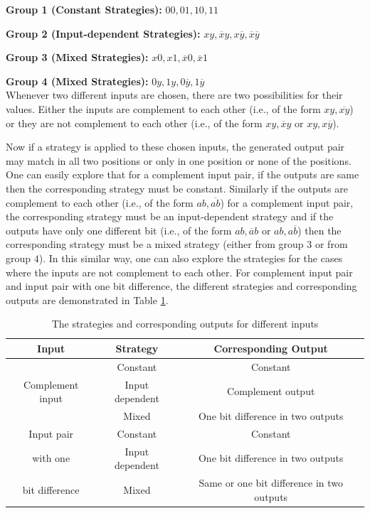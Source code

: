 \documentclass[]{svjour3}
\begin{document}
\textbf{Group 1 (Constant Strategies):} $00, 01, 10, 11$

\textbf{Group 2 (Input-dependent Strategies):} $xy, \overline{x}y, x\overline{y}, \overline{x}\overline{y}$

\textbf{Group 3 (Mixed Strategies):} $x0, x1, \overline{x}0, \overline{x}1$

\textbf{Group 4 (Mixed Strategies):} $0y, 1y, 0\overline{y}, 1\overline{y}$\\


Whenever two different inputs are chosen, there are two possibilities for their values. Either the inputs are complement to each other (i.e., of the form $xy, \overline{xy}$) or they are not complement to each other (i.e., of the form $xy, \overline{x}y$ or $xy, x\overline{y}$). 

Now if a strategy is applied to these chosen inputs, the generated output pair may match in all two positions or only in one position or none of the positions. One can easily explore that for a complement input pair, if the outputs are same then the corresponding strategy must be constant. Similarly if the outputs are complement to each other (i.e., of the form $ab, \overline{ab}$) for a complement input pair, the corresponding strategy must be an input-dependent strategy and if the outputs have only one different bit (i.e., of the form $ab, \overline{a}b$ or $ab, a\overline{b}$) then the corresponding strategy must be a mixed strategy (either from group $3$ or from group $4$). In this similar way, one can also explore the strategies for the cases where the inputs are not complement to each other. For complement input pair and input pair with one bit difference, the different strategies and corresponding outputs are demonstrated in Table \ref{ipopstr}.



\begin{table}[htb]
	\begin{center} 
		\begin{tabular}{|c|c|c|} 
			\hline
			Input & Strategy & Corresponding Output\\
			\hline
			\multirow{3}{*}{Complement input} & Constant & Constant\\
			& Input dependent & Complement output\\
			& Mixed & One bit difference in two outputs\\
			\hline
			Input pair & Constant & Constant\\
			 with one & Input dependent & One bit difference in two outputs\\
			bit difference & Mixed & Same or one bit difference in two outputs\\
			\hline
		\end{tabular}
	\end{center}
	\caption{The strategies and corresponding outputs for different inputs}
	\label{ipopstr}
\end{table}
\end{document}
